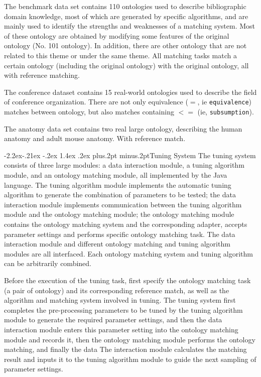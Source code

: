 \documentclass[twoside]{article}
\makeatletter
\def\subsubsection{\@startsection{subsubsection}{3}{\z@}%
 {-2.2ex\@plus -.21ex \@minus -.2ex}%
 {1.4ex \@plus.2ex}
{\normalfont\normalsize\protect\baselineskip=12pt plus.2pt minus.2pt\sl}}
\makeatother
\begin{document}
The benchmark data set contains 110 ontologies used to describe bibliographic domain knowledge, most of which are generated by specific algorithms, and are mainly used to identify the strengths and weaknesses of a matching system. Most of these ontology are obtained by modifying some features of the original ontology (No. 101 ontology). In addition, there are other ontology that are not related to this theme or under the same theme.
All matching tasks match a certain ontology (including the original ontology) with the original ontology, all with reference matching.

The conference dataset contains 15 real-world ontologies used to describe the field of conference organization. There are not only equivalence ($=$, ie \texttt{equivalence}) matches between ontology, but also matches containing $<=$ (ie, \texttt{subsumption}).

The anatomy data set contains two real large ontology, describing the human anatomy and adult mouse anatomy. With reference match.

\subsubsection{Tuning System}
The tuning system consists of three large modules: a data interaction module, a tuning algorithm module, and an ontology matching module, all implemented by the Java language.
The tuning algorithm module implements the automatic tuning algorithm to generate the combination of parameters to be tested; the data interaction module implements communication between the tuning algorithm module and the ontology matching module; the ontology matching module contains the ontology matching system and the corresponding adapter, accepts parameter settings and performs specific ontology matching task.
The data interaction module and different ontology matching and tuning algorithm modules are all interfaced. Each ontology matching system and tuning algorithm can be arbitrarily combined.


Before the execution of the tuning task, first specify the ontology matching task (a pair of ontology) and its corresponding reference match, as well as the algorithm and matching system involved in tuning.
The tuning system first completes the pre-processing parameters to be tuned by the tuning algorithm module to generate the required parameter settings, and then the data interaction module enters this parameter setting into the ontology matching module and records it, then the ontology matching module performs the ontology matching, and finally the data The interaction module calculates the matching result and inputs it to the tuning algorithm module to guide the next sampling of parameter settings.
\end{document}
